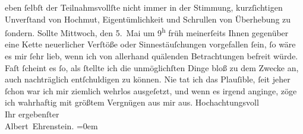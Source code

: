 \begin{ledgroupsized}[t]{13cm}
                    eben ſelbſt der Teilnahmsvollſte nicht immer in der Stimmung, kurzſichtigen
                    Unverſtand von Hochmut, Eigentümlichkeit und Schrullen von Überhebung zu
                    ſondern. Sollte Mittwoch, den 5. Mai um 9\textsuperscript{h} früh meinerſeits Ihnen gegenüber eine
                    Kette neuerlicher Verſtöße oder Sinnestäuſchungen vorgefallen ſein, ſo wäre es
                    mir ſehr lieb, wenn ich von allerhand quälenden Betrachtungen befreit würde.
                    Faſt ſcheint es ſo, als ſtellte ich die unmöglichſten Dinge bloß zu dem Zwecke
                    an, auch nachträglich entſchuldigen zu können. Nie tat ich das Plauſible, ſeit
                    jeher ſchon war ich mir ziemlich wehrlos ausgeſetzt, und wenn es irgend anginge,
                    zöge ich {\pb}wahrhaftig mit größtem Vergnügen aus mir
                    aus.\pend
           \pstart
           Hochachtungsvoll{\\[\baselineskip]}Ihr ergebenſter{\\[\baselineskip]}\spacefill\mbox{Albert Ehrenstein.}\pend
           \leftskip=0em{}\endnumbering{}\end{ledgroupsized}  \newcommand{\dateiname}{L01840}\newcommand{\titel}{Albert Ehrenstein an Arthur Schnitzler, 6. 5. 1909}\newcommand{\editorInnen}{Martin Anton Müller und Gerd-Hermann Susen}
      